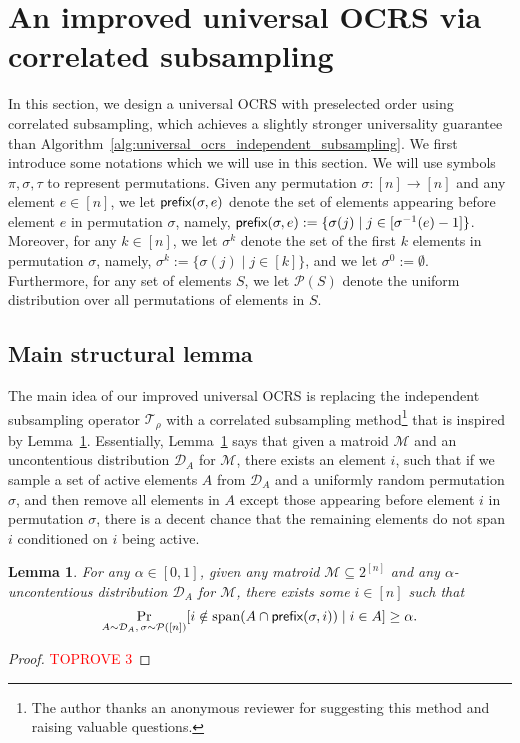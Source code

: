 \documentclass[11pt]{article}
\newcommand{\D}{\mathcal D}
\newcommand{\M}{{\mathcal M}}
\newcommand{\cP}{\mathcal P}
\newcommand{\T}{{\mathcal T}}
\newcommand{\pref}{\textnormal{\sffamily prefix}}
\newcommand{\spa}{\textnormal{span}}
\newtheorem{lemma}[theorem]{Lemma}
\begin{document}
\section{An improved universal OCRS via correlated subsampling}\label{sec:ocrs_correlated_subsampling}
In this section, we design a universal OCRS with preselected order using correlated subsampling, which achieves a slightly stronger universality guarantee than Algorithm~\ref{alg:universal_ocrs_independent_subsampling}. We first introduce some notations which we will use in this section. We will use symbols $\pi,\sigma,\tau$ to represent permutations. Given any permutation $\sigma:[n]\to[n]$ and any element $e\in[n]$, we let $\pref(\sigma,e)$ denote the set of elements appearing before element $e$ in permutation $\sigma$, namely, $\pref(\sigma,e) := \{\sigma(j) \mid j\in[\sigma^{-1}(e)-1]\}$. Moreover, for any $k\in[n]$, we let $\sigma^k$ denote the set of the first $k$ elements in permutation $\sigma$, namely, $\sigma^k:=\{\sigma(j)\mid j\in[k]\}$, and we let $\sigma^0:=\emptyset$. Furthermore, for any set of elements $S$, we let $\cP(S)$ denote the uniform distribution over all permutations of elements in $S$.
\subsection{Main structural lemma}
The main idea of our improved universal OCRS is replacing the independent subsampling operator $\T_{\rho}$ with a correlated subsampling method\footnote{The author thanks an anonymous reviewer for suggesting this method and raising valuable questions.} that is inspired by Lemma~\ref{lem:uncontentious_preceding_elements}. Essentially, Lemma~\ref{lem:uncontentious_preceding_elements} says that given a matroid $\M$ and an uncontentious distribution $\D_A$ for $\M$, there exists an element $i$, such that if we sample a set of active elements $A$ from $\D_A$ and a uniformly random permutation $\sigma$, and then remove all elements in $A$ except those appearing before element $i$ in permutation $\sigma$, there is a decent chance that the remaining elements do not span $i$ conditioned on $i$ being active.
\begin{lemma}\label{lem:uncontentious_preceding_elements}
For any $\alpha\in[0,1]$, given any matroid $\M\subseteq 2^{[n]}$ and any $\alpha$-uncontentious distribution $\D_A$ for $\M$, there exists some $i\in[n]$ such that
\[
    \Pr_{A\sim\D_A,\,\sigma\sim\cP([n])}[i \notin\spa(A\cap\pref(\sigma,i))\mid i\in A]\ge \alpha.
\]
\end{lemma}
\begin{proof}\textcolor{red}{TOPROVE 3}\end{proof}
\end{document}
